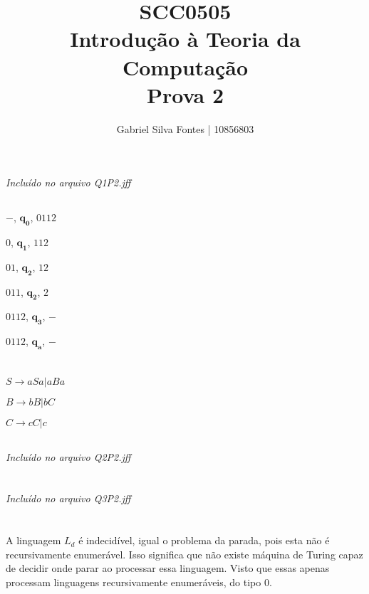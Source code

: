 \documentclass[12pt]{article}
\title{SCC0505 \\ Introdução à Teoria da Computação \\ Prova 2}
\author{Gabriel Silva Fontes | 10856803}
\begin{document}
\maketitle

\section{}
\subsection{}
\emph{Incluído no arquivo Q1P2.jff}
\subsection{}
\(-\), \(\bm{q_0}\), \(0112\)

\(0\), \(\bm{q_1}\), \(112\)

\(01\), \(\bm{q_2}\), \(12\)

\(011\), \(\bm{q_2}\), \(2\)

\(0112\), \(\bm{q_3}\), \(-\)

\(0112\), \(\bm{q_a}\), \(-\)

\section{}
\subsection{}
\(S \rightarrow aSa | aBa\)

\(B \rightarrow bB | bC\)

\(C \rightarrow cC | c \)
\subsection{}
\emph{Incluído no arquivo Q2P2.jff}

\section{}
\emph{Incluído no arquivo Q3P2.jff}

\section{}
A linguagem \(L_d\) é indecidível, igual o problema da parada, pois esta não é recursivamente enumerável. Isso significa que não existe máquina de Turing capaz de decidir onde parar ao processar essa linguagem. Visto que essas apenas processam linguagens recursivamente enumeráveis, do tipo 0.
\end{document}
